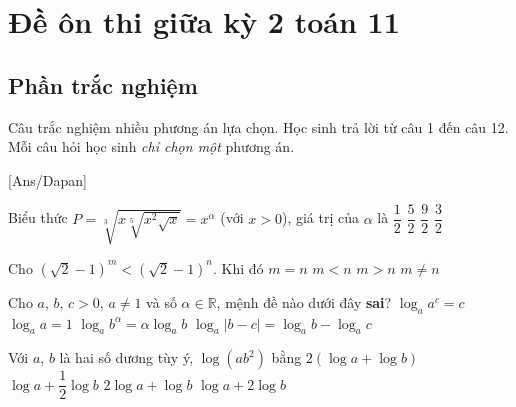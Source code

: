 \section{Đề ôn thi giữa kỳ 2 toán 11}
\subsection{Phần trắc nghiệm}
Câu trắc nghiệm nhiều phương án lựa chọn. Học sinh trả lời từ
câu 1 đến câu 12. Mỗi câu hỏi học sinh \textit{chỉ chọn một} phương án.

[Ans/Dapan]
 
\hienthiloigiaiex
\begin{ex}%
	Biểu thức $P=\sqrt[3]{x\sqrt[5]{x^2\sqrt{x}}}=x^{\alpha }$ (với $x>0$), giá trị của $\alpha $ là
	\choice
		{\True $\dfrac{1}{2}$}
		{$\dfrac{5}{2}$}
		{$\dfrac{9}{2}$}
		{$\dfrac{3}{2}$}
\end{ex}
\begin{ex}%
	Cho $(\sqrt{2}-1)^m<(\sqrt{2}-1)^n$. Khi đó
	\choice
		{$m=n$}
		{$m<n$}
		{\True $m>n$}
		{$m\ne n$}
\end{ex}

\begin{ex}%
	Cho $a$, $b$, $c>0$, $a\ne 1$ và số $\alpha \in \mathbb{R}$, mệnh đề nào dưới đây \textbf{sai}?	
	\choice
		{${\log }_a{a^c}=c$}
		{${\log }_a a=1$}
		{${\log }_a{b^{\alpha }}=\alpha {\log }_a b$}
		{\True ${\log }_a\left| b-c \right|={\log }_a b-{\log }_a c$}
\end{ex}
  
\begin{ex}%
	Với $a$, $b$ là hai số dương tùy ý, $\log \left(ab^2\right)$ bằng
	\choice
		{$2\left( \log a+\log b \right)$}
		{$\log a+\dfrac{1}{2}\log b$}
		{$2\log a+\log b$}
		{\True $\log a+2\log b$}
\end{ex}
  
